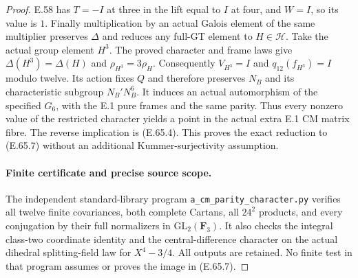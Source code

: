 \begin{proof}
E.58 has $T=-I$ at three in the lift equal to $I$ at four, and
$W=I$, so its value is $1$. Finally multiplication by an actual
Galois element of the same multiplier preserves $\Delta$ and
reduces any full-GT element to $H\in\mathcal H$. Take the actual
group element $H^3$. The proved character and frame laws give
$\Delta(H^3)=\Delta(H)$ and $\rho_{H^3}=3\rho_H$.
Consequently $V_{H^3}=I$ and $q_{12}(f_{H^3})=I$ modulo twelve.
Its action fixes $Q$ and therefore preserves $N_B$ and its
characteristic subgroup $N_B'N_B^6$. It induces an actual
automorphism of the specified $G_6$, with the E.1 pure frames
and the same parity. Thus every nonzero value of the restricted
character yields a point in the actual extra E.1 CM matrix
fibre. The reverse implication is \textup{(E.65.4)}.
This proves the exact reduction to \textup{(E.65.7)} without
an additional Kummer-surjectivity assumption.

\paragraph{Finite certificate and precise source scope.}
The independent standard-library program
\texttt{a\_cm\_parity\_character.py} verifies all twelve finite
covariances, both complete Cartans, all $24^2$ products, and
every conjugation by their full normalizers in
$\mathrm{GL}_2(\mathbf F_3)$. It also checks the integral
class-two coordinate identity and the central-difference character
on the actual dihedral splitting-field law for $X^4-3/4$.
All outputs are retained. No finite test in that program assumes
or proves the image in \textup{(E.65.7)}.
\end{proof}
